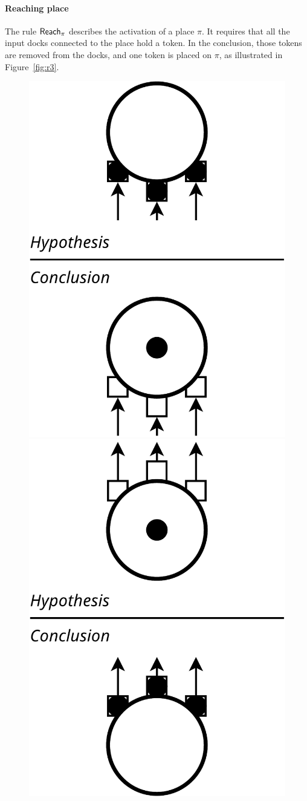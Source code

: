 \paragraph{Reaching place}{

The rule $\mathsf{Reach}_\pi$ describes the activation of a place $\pi$. It
requires that all the input docks connected to the place hold a
token. In the conclusion, those tokens are removed from the docks, and
one token is placed on $\pi$, as illustrated in Figure~\ref{fig:r3}.

\begin{figure}[t]

\begin{minipage}[h]{0.45\columnwidth}%
  \centering
  \includegraphics[width=0.65\columnwidth]{./images/inputdocks_to_place.pdf}
\end{minipage}
\hfill
\begin{minipage}[h]{0.45\columnwidth}%
  \centering
  \includegraphics[width=0.65\columnwidth]{./images/place_to_outputdocks.pdf}

\end{minipage}
\end{figure}}
